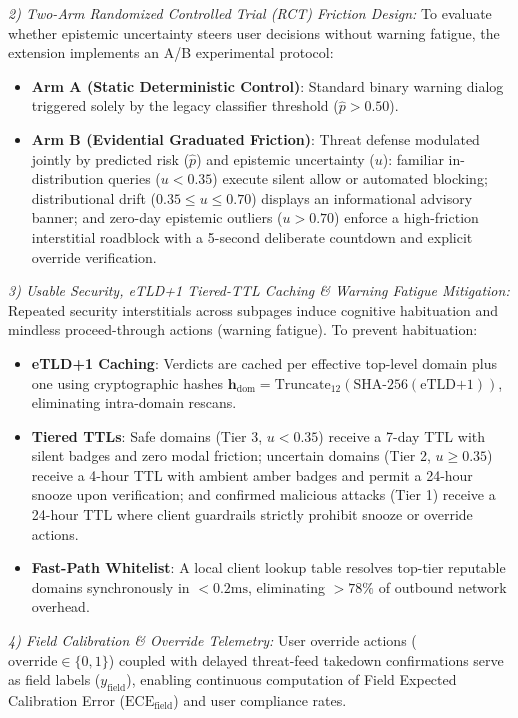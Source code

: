 \documentclass[conference]{IEEEtran}
\begin{document}
\textit{2) Two-Arm Randomized Controlled Trial (RCT) Friction Design:} To evaluate whether epistemic uncertainty steers user decisions without warning fatigue, the extension implements an A/B experimental protocol:
\begin{itemize}
    \item \textbf{Arm A (Static Deterministic Control)}: Standard binary warning dialog triggered solely by the legacy classifier threshold ($\hat{p} > 0.50$).
    \item \textbf{Arm B (Evidential Graduated Friction)}: Threat defense modulated jointly by predicted risk ($\hat{p}$) and epistemic uncertainty ($u$): familiar in-distribution queries ($u < 0.35$) execute silent allow or automated blocking; distributional drift ($0.35 \le u \le 0.70$) displays an informational advisory banner; and zero-day epistemic outliers ($u > 0.70$) enforce a high-friction interstitial roadblock with a 5-second deliberate countdown and explicit override verification.
\end{itemize}

\textit{3) Usable Security, eTLD+1 Tiered-TTL Caching \& Warning Fatigue Mitigation:} Repeated security interstitials across subpages induce cognitive habituation and mindless proceed-through actions (warning fatigue). To prevent habituation:
\begin{itemize}
    \item \textbf{eTLD+1 Caching}: Verdicts are cached per effective top-level domain plus one using cryptographic hashes $\mathbf{h}_{\text{dom}} = \text{Truncate}_{12}(\text{SHA-256}(\text{eTLD+1}))$, eliminating intra-domain rescans.
    \item \textbf{Tiered TTLs}: Safe domains (Tier 3, $u < 0.35$) receive a 7-day TTL with silent badges and zero modal friction; uncertain domains (Tier 2, $u \ge 0.35$) receive a 4-hour TTL with ambient amber badges and permit a 24-hour snooze upon verification; and confirmed malicious attacks (Tier 1) receive a 24-hour TTL where client guardrails strictly prohibit snooze or override actions.
    \item \textbf{Fast-Path Whitelist}: A local client lookup table resolves top-tier reputable domains synchronously in $<0.2\text{ms}$, eliminating $>78\%$ of outbound network overhead.
\end{itemize}

\textit{4) Field Calibration \& Override Telemetry:} User override actions ($\text{override} \in \{0, 1\}$) coupled with delayed threat-feed takedown confirmations serve as field labels ($y_{\text{field}}$), enabling continuous computation of Field Expected Calibration Error ($\text{ECE}_{\text{field}}$) and user compliance rates.
\end{document}
